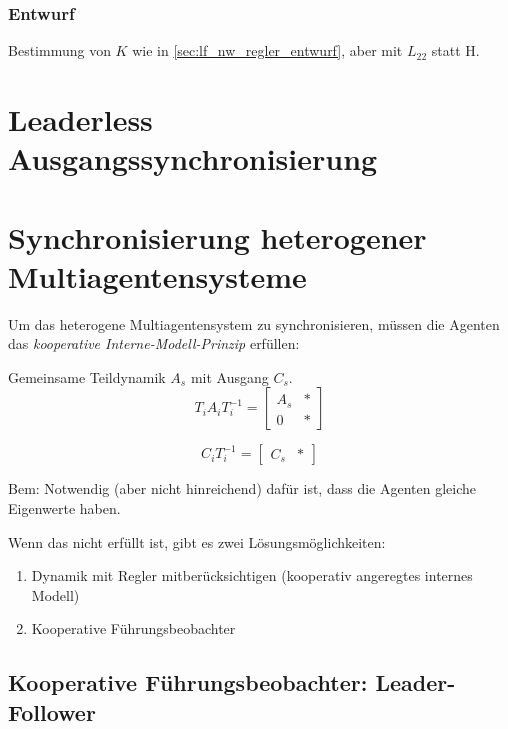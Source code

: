 \subsubsection{Entwurf}
Bestimmung von $K$ wie in \ref{sec:lf_nw_regler_entwurf},
aber mit $L_{22}$ statt H.



\section{Leaderless Ausgangssynchronisierung}



\section{Synchronisierung heterogener Multiagentensysteme}

Um das heterogene Multiagentensystem zu synchronisieren, müssen die Agenten das \emph{kooperative Interne-Modell-Prinzip} erfüllen:

Gemeinsame Teildynamik $A_s$ mit Ausgang $C_s$.
\begin{equation}
    T_i A_i T_i^{-1} = \begin{bmatrix}
        A_s & * \\
        0 & *
    \end{bmatrix}
\end{equation}

\begin{equation}
    C_i T_i^{-1} = \begin{bmatrix}
        C_s & *
    \end{bmatrix}
\end{equation}

Bem: Notwendig (aber nicht hinreichend) dafür ist, dass die Agenten gleiche Eigenwerte haben.

Wenn das nicht erfüllt ist, gibt es zwei Lösungsmöglichkeiten:
\begin{enumerate}
    \item Dynamik mit Regler mitberücksichtigen (kooperativ angeregtes internes Modell)
    \item Kooperative Führungsbeobachter
\end{enumerate}

\subsection{Kooperative Führungsbeobachter: Leader-Follower}


